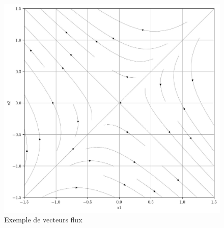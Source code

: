         \begin{figure}[ht!]
            \centering
            \includegraphics[width=\textwidth]{images/vecteurs_flux.jpg}
            \caption{Exemple de vecteurs flux}
            \label{fig:vecteurs_flux}
        \end{figure}

    
